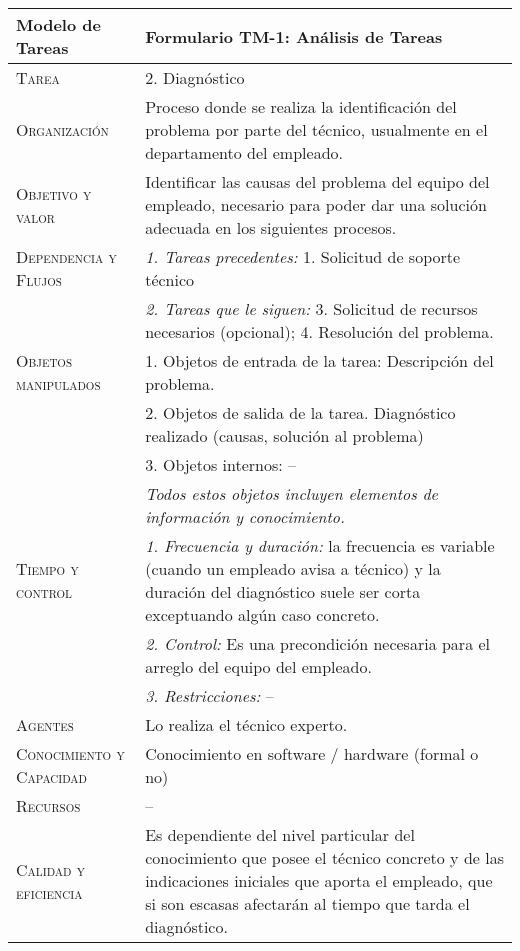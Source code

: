 \documentclass[12pt,a4paper,twoside,spanish]{article}      %
\begin{document}
\begin{table}[H]
\scriptsize
\begin{tabularx}{\textwidth}{|l|X|} \hline

\textbf{Modelo de Tareas} & \textbf{Formulario TM-1: Análisis de Tareas}
 \\ \hline\hline
\textsc{Tarea} 
& 2. Diagnóstico
\\ \hline
\textsc{Organización}  
& Proceso donde se realiza la identificación del problema por parte del técnico, usualmente en el departamento del empleado.
\\ \hline
\textsc{Objetivo y valor} 
& Identificar las causas del problema del equipo del empleado, necesario para poder dar una solución adecuada en los siguientes procesos.
\\ \hline
\textsc{Dependencia y Flujos} 
& \textit{1. Tareas precedentes:} 
1. Solicitud de soporte técnico
\\
 &  \textit{2. Tareas que le siguen:} 
 3. Solicitud de recursos necesarios (opcional); 4. Resolución del problema.
 \\ \hline
\textsc{Objetos manipulados} 
& 1. Objetos de entrada de la tarea:
Descripción del problema.
\\
  &  2. Objetos de salida de la tarea.
 Diagnóstico realizado (causas, solución al problema)
 \\
  &  3. Objetos internos: --
  \\
& \emph{Todos estos objetos incluyen elementos de información y conocimiento.}
\\ \hline
\textsc{Tiempo y control} & \textit{1. Frecuencia y duración:}
la frecuencia es variable (cuando un empleado avisa a técnico) y la duración del diagnóstico suele ser corta exceptuando algún caso concreto.
\\
& \textit{2. Control:} Es una precondición necesaria para el arreglo del equipo del empleado.
\\
& \textit{3. Restricciones:} --
\\ \hline
\textsc{Agentes} &
Lo realiza el técnico experto.
\\ \hline
\textsc{Conocimiento y
Capacidad} &
Conocimiento en software / hardware (formal o no)
 \\ \hline
\textsc{Recursos} &
--
 \\ \hline
\textsc{Calidad y eficiencia} &
Es dependiente del nivel particular del conocimiento que posee el técnico concreto y de las indicaciones iniciales que aporta el empleado, que si son escasas afectarán al tiempo que tarda el diagnóstico.
\\ \hline
\end{tabularx}

  \label{tab.TM1}
\end{table}
\end{document}
